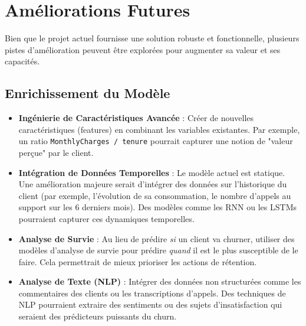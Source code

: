 \chapter{Améliorations Futures}
\label{chap:ameliorations_futures}

Bien que le projet actuel fournisse une solution robuste et fonctionnelle, plusieurs pistes d'amélioration peuvent être explorées pour augmenter sa valeur et ses capacités.

\section{Enrichissement du Modèle}
\begin{itemize}
    \item \textbf{Ingénierie de Caractéristiques Avancée} : Créer de nouvelles caractéristiques (features) en combinant les variables existantes. Par exemple, un ratio \texttt{MonthlyCharges / tenure} pourrait capturer une notion de "valeur perçue" par le client.
    \item \textbf{Intégration de Données Temporelles} : Le modèle actuel est statique. Une amélioration majeure serait d'intégrer des données sur l'historique du client (par exemple, l'évolution de sa consommation, le nombre d'appels au support sur les 6 derniers mois). Des modèles comme les RNN ou les LSTMs pourraient capturer ces dynamiques temporelles.
    \item \textbf{Analyse de Survie} : Au lieu de prédire \textit{si} un client va churner, utiliser des modèles d'analyse de survie pour prédire \textit{quand} il est le plus susceptible de le faire. Cela permettrait de mieux prioriser les actions de rétention.
    \item \textbf{Analyse de Texte (NLP)} : Intégrer des données non structurées comme les commentaires des clients ou les transcriptions d'appels. Des techniques de NLP pourraient extraire des sentiments ou des sujets d'insatisfaction qui seraient des prédicteurs puissants du churn.
\end{itemize}

